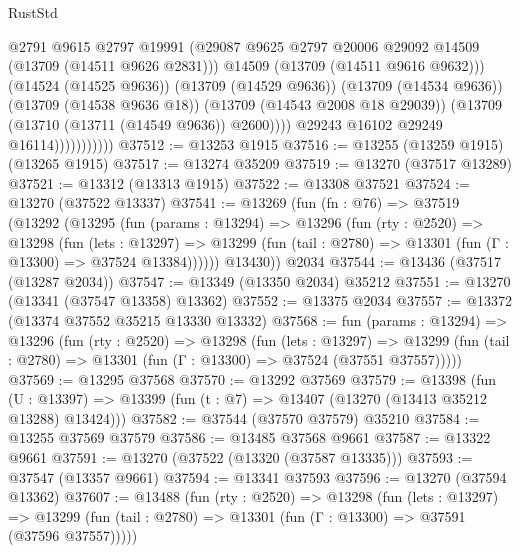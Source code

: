 \begin{lexlean}{RustStd}
\begin{coremodule}
                                @2791
                                @9615
                                @2797
                                @19991
                                (@29087
                                  @9625
                                  @2797
                                  @20006
                                  @29092
                                  @14509
                                  (@13709 (@14511 @9626 @2831)))
                                @14509
                                (@13709 (@14511 @9616 @9632)))
                              (@14524 (@14525 @9636))
                              (@13709 (@14529 @9636))
                              (@13709 (@14534 @9636))
                              (@13709 (@14538 @9636 @18))
                              (@13709 (@14543 @2008 @18 @29039))
                              (@13709 (@13710 (@13711 (@14549 @9636)) @2600))))
                          @29243
                          @16102
                          @29249
                          @16114)))))))))))
@37512 := @13253 @1915
@37516 := @13255 (@13259 @1915) (@13265 @1915)
@37517 := @13274 @35209
@37519 := @13270 (@37517 @13289)
@37521 := @13312 (@13313 @1915)
@37522 := @13308 @37521
@37524 := @13270 (@37522 @13337)
@37541 := @13269
    (fun (fn : @76) =>
    @37519
      (@13292
        (@13295
          (fun (params : @13294) =>
          @13296
            (fun (rty : @2520) =>
            @13298
              (fun (lets : @13297) =>
              @13299 (fun (tail : @2780) => @13301 (fun (Γ : @13300) => @37524 @13384))))))
        @13430))
    @2034
@37544 := @13436 (@37517 (@13287 @2034))
@37547 := @13349 (@13350 @2034) @35212
@37551 := @13270 (@13341 (@37547 @13358) @13362)
@37552 := @13375 @2034
@37557 := @13372 (@13374 @37552 @35215 @13330 @13332)
@37568 := fun (params : @13294) =>
  @13296
    (fun (rty : @2520) =>
    @13298
      (fun (lets : @13297) =>
      @13299 (fun (tail : @2780) => @13301 (fun (Γ : @13300) => @37524 (@37551 @37557)))))
@37569 := @13295 @37568
@37570 := @13292 @37569
@37579 := @13398
    (fun (U : @13397) => @13399 (fun (t : @7) => @13407 (@13270 (@13413 @35212 @13288) @13424)))
@37582 := @37544 (@37570 @37579) @35210
@37584 := @13255 @37569 @37579
@37586 := @13485 @37568 @9661
@37587 := @13322 @9661
@37591 := @13270 (@37522 (@13320 (@37587 @13335)))
@37593 := @37547 (@13357 @9661)
@37594 := @13341 @37593
@37596 := @13270 (@37594 @13362)
@37607 := @13488
    (fun (rty : @2520) =>
    @13298
      (fun (lets : @13297) =>
      @13299 (fun (tail : @2780) => @13301 (fun (Γ : @13300) => @37591 (@37596 @37557)))))

\end{coremodule}
\end{lexlean}
